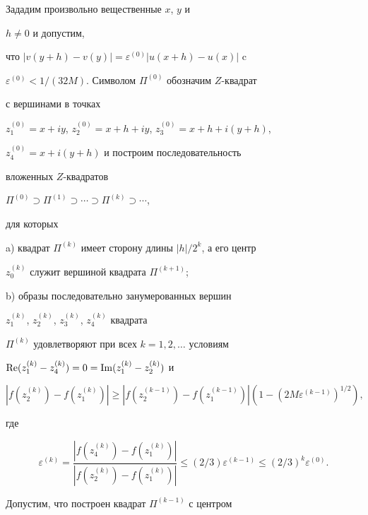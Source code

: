 \begin{pf}


Зададим произвольно вещественные $x$, $y$ и 


$h\neq0$ и допустим, 


что $|v(y+h) - v(y)| = \varepsilon^{(0)} |u(x+h)-u(x)|$ c 


$\varepsilon^{(0)} < 1/(32M)$. Символом $\Pi^{(0)}$ обозначим $Z$-квадрат 


с вершинами в точках 


$z_1^{(0)} = x+iy$, $z_2^{(0)} = x+h+iy$, $z_3^{(0)} = x+h+i(y+h)$, 


$z_4^{(0)} = x+i(y+h)$  и построим последовательность 


вложенных $Z$-квадратов 


$\Pi^{(0)} \supset \Pi^{(1)} \supset \dotsb \supset\Pi^{(k)}\supset\dotsb$, 


для которых





a) квадрат $\Pi^{(k)}$ имеет сторону длины $|h|/2^k$, а его центр 


$z_0^{(k)}$ служит вершиной квадрата $\Pi^{(k+1)}$;





b) образы последовательно занумерованных вершин 


$z_1^{(k)}$, $z_2^{(k)}$, $z_3^{(k)}$, $z_4^{(k)}$ квадрата 


$\Pi^{(k)}$ удовлетворяют при всех $k=1,2,\dotsc$ условиям 


$\operatorname{Re}(z_1^{(k)} - z_4^{(k)}) = 0 = \operatorname{Im}(z_1^{(k)} - z_2^{(k)})$ и


$$


|f(z_2^{(k)}) - f(z_1^{(k)})| \geq |f(z_2^{(k-1)}) - f(z_1^{(k-1)})| 


(1-(2M\varepsilon^{(k-1)})^{1/2}), 


$$


где 


$$


\varepsilon^{(k)} = \frac{|f(z_4^{(k)}) - f(z_1^{(k)})|}


{|f(z_2^{(k)}) - f(z_1^{(k)})|} \leq (2/3)\varepsilon^{(k-1)} 


\leq (2/3)^k \varepsilon^{(0)}. 


$$





Допустим, что построен квадрат $\Pi^{(k-1)}$ с центром 



\end{pf}
